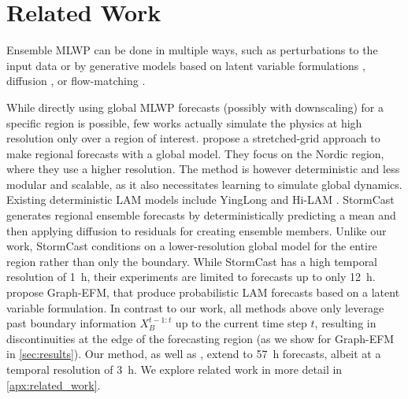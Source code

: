 \section{Related Work}
Ensemble MLWP can be done in multiple ways, such as perturbations to the input data \citep{chen2023fuxi, pathak2022fourcastnet, pangu, graubner2022calibration, bulte2024uncertainty} or by generative models based on latent variable formulations \citep{oskarsson2024probabilistic, SwinVRNN}, diffusion \citep{gencast, andrae2024continuousensembleweatherforecasting, shi2024codicastconditionaldiffusionmodel}, or flow-matching \citep{couairon2024archesweatherarchesweathergendeterministic}.

While directly using global MLWP forecasts (possibly with downscaling) for a specific region is possible, few works actually simulate the physics at high resolution only over a region of interest.
\citet{stretch_grid_norway} propose a stretched-grid approach to make regional forecasts with a global model. They focus on the Nordic region, where they use a higher resolution. 
The method is however deterministic and less modular and scalable, as it also necessitates learning to simulate global dynamics.
Existing deterministic LAM models include YingLong \citep{xu2024yinglongskillfulhighresolution} and Hi-LAM \citep{oskarsson2023graph-lam}.
StormCast \citep{stormCast} generates regional ensemble forecasts by deterministically predicting a mean and then applying diffusion to residuals for creating ensemble members. Unlike our work, StormCast conditions on a lower-resolution global model for the entire region rather than only the boundary. While StormCast has a high temporal resolution of \SI{1}{\hour}, their experiments are limited to forecasts up to only \SI{12}{\hour}.
\citet{oskarsson2024probabilistic} propose Graph-EFM, that produce probabilistic LAM forecasts based on a latent variable formulation. In contrast to our work, all methods above only leverage past boundary information $X^{t-1:t}_B$ up to the current time step $t$, resulting in discontinuities at the edge of the forecasting region (as we show for Graph-EFM in \cref{sec:results}). 
Our method, as well as \citet{oskarsson2023graph-lam, oskarsson2024probabilistic}, extend to \SI{57}{\hour} forecasts, albeit at a temporal resolution of \SI{3}{\hour}. We explore related work in more detail in \cref{apx:related_work}.